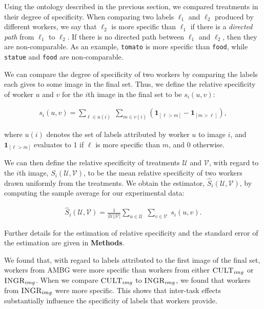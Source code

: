 \documentclass[a4paper]{report}
\begin{document}
Using the ontology described in the previous section, we compared treatments 
in their degree of specificity.  When comparing two labels $\ell_1$ and 
$\ell_2$ produced by different workers, we say that $\ell_2$ is more specific 
than $\ell_1$ if there is a \textit{directed path} from $\ell_1$ to $\ell_2$.  
If there is no directed path between $\ell_1$ and $\ell_2$, then they are 
non-comparable.  As an example, \texttt{tomato} is more specific than 
\texttt{food}, while \texttt{statue} and \texttt{food} are non-comparable.

We can compare the degree of specificity of two workers by comparing the 
labels each gives to some image in the final set.  Thus, we define the relative
specificity of worker $u$ and $v$ for the $i$th image in the final set to be
$s_i(u,v)$:

\begin{align}
	s_i(u,v) = \sum_{\ell \in u(i) } \;
	\sum_{m \in v(i)} 
	\left(\mathbf{1}_{[\ell > m]} - \mathbf{1}_{[m>\ell]}\right),
	\label{eq:worker-specificity}
\end{align}

where $u(i)$ denotes the set of labels attributed by worker $u$ to image $i$, 
and $\mathbf{1}_{[\ell > m]}$ evaluates to 1 if $\ell$ is more specific than 
$m$, and 0 otherwise.

We can then define the relative specificity of treatments $\mathcal{U}$ and 
$\mathcal{V}$, with regard to
the $i$th image, $S_i(\mathcal{U},\mathcal{V})$, to be the mean
relative specificity of two workers drawn uniformly from the treatments.  
We obtain the estimator, $\hat{S}_i(\mathcal{U},\mathcal{V})$, by computing
the sample average for our experimental data:

\begin{align}
	\hat{S}_i(\mathcal{U},\mathcal{V}) = 
	\frac{1}{|\mathcal{U}| |\mathcal{V}|}
	\sum_{u \in \mathcal{U}} \;
	\sum_{v \in \mathcal{V}} \;
		s_i(u,v).
		\label{eq:specificity}
\end{align}

Further details for the estimation of relative specificity and the standard
error of the estimation are given in \textbf{Methods}.

We found that, with regard to labels attributed to the first image of the 
final set, workers from \textsc{AMBG} were more specific than workers from
either $\textsc{CULT}_{img}$ or $\textsc{INGR}_{img}$.  When we compare 
$\textsc{CULT}_{img}$ to $\textsc{INGR}_{img}$, we found that workers from
$\textsc{INGR}_{img}$ were more specific.  This shows that inter-task 
effects substantially influence the specificity of labels that workers provide.
\end{document}

